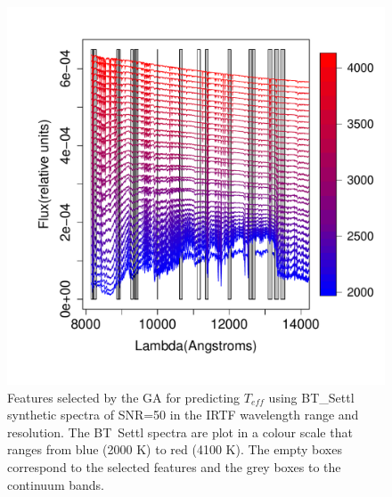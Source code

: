 \begin {figure}
 \centering
  \includegraphics[scale=0.55]{figs/BT-spectraAtIRTF-50-teff}
  \caption{Features selected by the GA for predicting $T_{eff}$ using
    BT\_Settl synthetic spectra of SNR=50 in the IRTF wavelength range
    and resolution. The BT\ Settl spectra are plot in a colour scale
    that ranges from blue (2000 K) to red (4100 K). The empty boxes
    correspond to the selected features and the grey boxes to the
    continuum bands.}
\label{fig:irtf-teff-50}
\end {figure}


